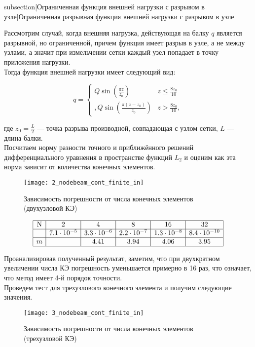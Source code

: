 \documentclass[12pt,a4paper]{article}
\begin{document}
subsection[Ограниченная функция внешней нагрузки с разрывом в узле]{Ограниченная разрывная функция внешней нагрузки с разрывом в узле}

Рассмотрим случай, когда внешняя нагрузка, действующая на балку $q$ является разрывной, но ограниченной, причем функция имеет разрыв в узле, а не между узлами, а значит при измельчении сетки каждый узел попадает в точку приложения нагрузки. \\

 Тогда функция внешней нагрузки имеет следующий вид:

\begin{equation}
q = 
 \begin{cases}
	Q \sin \left(\frac{\pi  z}{z_{0}}\right) & z \leq \frac{8 z_{0}}{10} \\,
    Q \sin \left(\frac{\pi  (z-z_{0})}{z_{0}}\right) & z > \frac{8 z_{0}}{10} ,
 \end{cases}
\end{equation}

где $z_{0}=\frac{L}{2}$ --- точка разрыва производной, совпадающая с узлом сетки, $L$ --- длина балки. \\

Посчитаем норму разности точного и приближённого решений дифференциального уравнения в пространстве функций $L_{2}$  и оценим как эта норма зависит от количества конечных элементов.\\

\begin{figure}[H]
	\centering
	\texttt{[image: 2\_nodebeam\_cont\_finite\_in]}
	\caption{Зависимость погрешности от числа конечных элементов (двухузловой КЭ)}
	\label{fig:2_nodebeam_cont_finite_in}
\end{figure}
\[
\begin{array}{|c|c|c|c|c|c|}
	\hline
	\text{N} & 2 & 4 & 8 & 16 & 32 \\ \hline
\Delta  & 7.1 \cdot 10^{-5} & 3.3 \cdot 10^{-6} & 2.2 \cdot 10^{-7} & 1.3 \cdot 10^{-8} & 8.4 \cdot 10^{-10}\\ \hline
m  &  & 4.41 & 3.94 & 4.06 & 3.95 \\ 
	\hline
	\end{array}
	\]

Проанализировав полученный результат, заметим, что при двухкратном увеличении числа КЭ погрешность уменьшается примерно в 16 раз, что означает, что метод имеет 4-й порядок точности.\\

 Проведем тест для трехузлового конечного элемента и получим следующие значения. 
\begin{figure}[H]
		\centering
		\texttt{[image: 3\_nodebeam\_cont\_finite\_in]}
		\caption{Зависимость погрешности от числа конечных элементов (трехузловой КЭ)}
		\label{fig:3_nodebeam_cont_finite_in}
	\end{figure}
\end{document}
